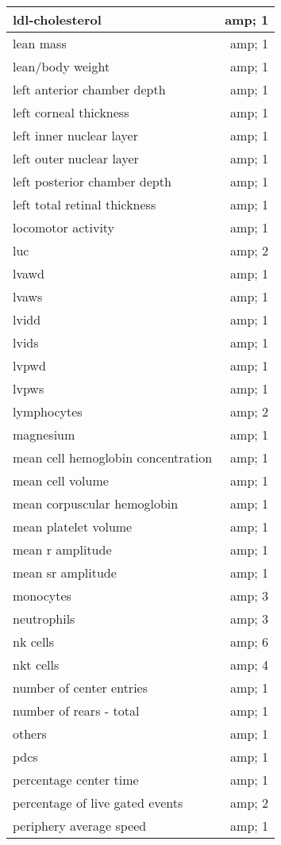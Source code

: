 \documentclass[]{article}
\begin{document}
\begin{tabular}[t]{l|r}
\hline
ldl-cholesterol &amp; 1\\
\hline
lean mass &amp; 1\\
\hline
lean/body weight &amp; 1\\
\hline
left anterior chamber depth &amp; 1\\
\hline
left corneal thickness &amp; 1\\
\hline
left inner nuclear layer &amp; 1\\
\hline
left outer nuclear layer &amp; 1\\
\hline
left posterior chamber depth &amp; 1\\
\hline
left total retinal thickness &amp; 1\\
\hline
locomotor activity &amp; 1\\
\hline
luc &amp; 2\\
\hline
lvawd &amp; 1\\
\hline
lvaws &amp; 1\\
\hline
lvidd &amp; 1\\
\hline
lvids &amp; 1\\
\hline
lvpwd &amp; 1\\
\hline
lvpws &amp; 1\\
\hline
lymphocytes &amp; 2\\
\hline
magnesium &amp; 1\\
\hline
mean cell hemoglobin concentration &amp; 1\\
\hline
mean cell volume &amp; 1\\
\hline
mean corpuscular hemoglobin &amp; 1\\
\hline
mean platelet volume &amp; 1\\
\hline
mean r amplitude &amp; 1\\
\hline
mean sr amplitude &amp; 1\\
\hline
monocytes &amp; 3\\
\hline
neutrophils &amp; 3\\
\hline
nk cells &amp; 6\\
\hline
nkt cells &amp; 4\\
\hline
number of center entries &amp; 1\\
\hline
number of rears - total &amp; 1\\
\hline
others &amp; 1\\
\hline
pdcs &amp; 1\\
\hline
percentage center time &amp; 1\\
\hline
percentage of live gated events &amp; 2\\
\hline
periphery average speed &amp; 1\\

\end{tabular}
\end{document}
